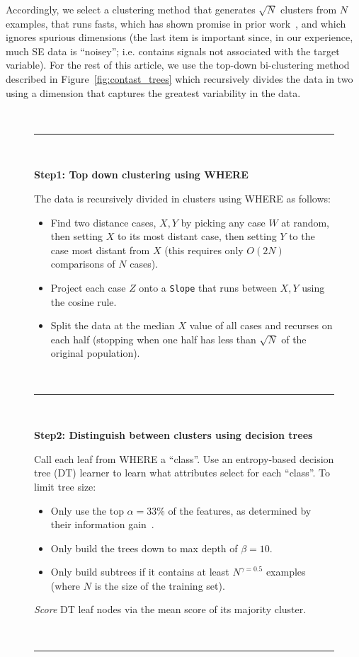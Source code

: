 \documentclass[conference]{IEEEtran}
\newcommand{\bi}{\begin{itemize}}
\newcommand{\ei}{\end{itemize}}
\newcommand{\fig}[1]{Figure~\ref{fig:#1}}
\begin{document}
	Accordingly, we select a clustering method that generates $\sqrt{N}$ clusters
	from $N$ examples, that runs fasts, which has shown promise in prior work~\cite{Menzies2013}, and which ignores spurious dimensions (the last item is important since, in our experience, much SE data is ``noisey''; i.e. contains signals not associated with the target variable). For the rest of this article,
	we use  the top-down
	bi-clustering method described in \fig{contast_trees} which recursively divides the
	data in two  using a dimension that captures the greatest variability in the data. 
	\begin{figure}[t]
		\small
		~\hrule~
		
		{\bf Step1: Top down clustering using WHERE}
		
		The data is recursively divided in clusters using WHERE as follows:
		\begin{itemize}
			
			\item Find   two   distance cases,  $X,Y$
			by picking any case $W$ at random, then setting $X$ to its most
			distant case, then setting $Y$ to the case most distant from
			$X$
			(this requires only $O(2N)$ comparisons
			of $N$ cases).
			\item Project each case $Z$
			onto a {\tt Slope} that  runs between $X,Y$ using the cosine
			rule. 
			\item Split the data at the median $X$ value of all cases and
			recurses on each half  (stopping when
			one half has less  than $\sqrt{N}$ of the original population).
		\end{itemize}
		~\hrule~
		
		{\bf Step2: Distinguish between clusters using  decision trees}
		
		Call each leaf from WHERE a  ``class''. Use an entropy-based
		 decision tree (DT) learner to learn what attributes select for each ``class''. To limit tree size:
		 \bi
		 \item Only use the top $\alpha=33$\%  of the features, as determined by their information gain~\cite{Irani1993}. 
		 \item Only build the trees down to  max depth of $\beta=10$.
		 \item Only build subtrees if it contains at least $N^{\gamma=0.5}$ examples (where $N$ is the size of the training set).
\ei
{\em Score}  DT  leaf nodes  via the mean score of its majority cluster. 
		
		~\hrule~
		

\end{figure}
\end{document}
